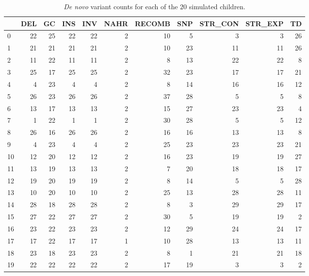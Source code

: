 \begin{table}[]
\centering
\caption{\textit{De novo} variant counts for each of the $20$ simulated children.}
\label{tb:simstats}
\begin{tabular}{lrrrrrrrrrr}
\toprule
  & DEL & GC & INS & INV & NAHR & RECOMB & SNP & STR\_CON & STR\_EXP & TD\\
\midrule
0 & 22 & 25 & 22 & 22 & 2 & 10 & 5 & 3 & 3 & 26\\
1 & 21 & 21 & 21 & 21 & 2 & 10 & 23 & 11 & 11 & 26\\
2 & 11 & 22 & 11 & 11 & 2 & 8 & 13 & 22 & 22 & 8\\
3 & 25 & 17 & 25 & 25 & 2 & 32 & 23 & 17 & 17 & 21\\
4 & 4 & 23 & 4 & 4 & 2 & 8 & 14 & 16 & 16 & 12\\
5 & 26 & 23 & 26 & 26 & 2 & 37 & 28 & 5 & 5 & 8\\
6 & 13 & 17 & 13 & 13 & 2 & 15 & 27 & 23 & 23 & 4\\
7 & 1 & 22 & 1 & 1 & 2 & 30 & 28 & 5 & 5 & 12\\
8 & 26 & 16 & 26 & 26 & 2 & 16 & 16 & 13 & 13 & 8\\
9 & 4 & 23 & 4 & 4 & 2 & 25 & 23 & 23 & 23 & 21\\
10 & 12 & 20 & 12 & 12 & 2 & 16 & 23 & 19 & 19 & 27\\
11 & 13 & 19 & 13 & 13 & 2 & 7 & 20 & 18 & 18 & 17\\
12 & 19 & 20 & 19 & 19 & 2 & 8 & 14 & 5 & 5 & 28\\
13 & 10 & 20 & 10 & 10 & 2 & 25 & 13 & 28 & 28 & 11\\
14 & 28 & 18 & 28 & 28 & 2 & 8 & 3 & 29 & 29 & 17\\
15 & 27 & 22 & 27 & 27 & 2 & 30 & 5 & 19 & 19 & 2\\
16 & 23 & 22 & 23 & 23 & 2 & 12 & 29 & 24 & 24 & 17\\
17 & 17 & 22 & 17 & 17 & 1 & 10 & 28 & 13 & 13 & 11\\
18 & 23 & 18 & 23 & 23 & 2 & 8 & 1 & 21 & 21 & 18\\
19 & 22 & 22 & 22 & 22 & 2 & 17 & 19 & 3 & 3 & 2\\
\bottomrule
\end{tabular}
\end{table}
